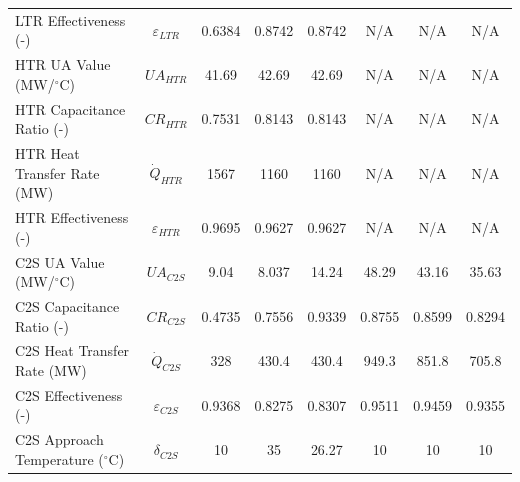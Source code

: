 \begin{specialtable}[H]
{\begin{tabular}{lccccccc}
    LTR Effectiveness (-)	&	$\varepsilon_{LTR}$	&	0.6384	&	0.8742	&	0.8742	&	N/A	&	N/A	&	N/A	\\
    HTR UA Value (MW/$^{\circ}$C)	&	$UA_{HTR}$	&	41.69	&	42.69	&	42.69	&	N/A	&	N/A	&	N/A	\\
    HTR Capacitance Ratio (-)	&	$CR_{HTR}$	&	0.7531	&	0.8143	&	0.8143	&	N/A	&	N/A	&	N/A	\\
    HTR Heat Transfer Rate (MW)	&	$\dot{Q}_{HTR}$	&	1567	&	1160	&	1160	&	N/A	&	N/A	&	N/A	\\
    HTR Effectiveness (-)	&	$\varepsilon_{HTR}$	&	0.9695	&	0.9627	&	0.9627	&	N/A	&	N/A	&	N/A	\\
    C2S UA Value (MW/$^{\circ}$C)	&	$UA_{C2S}$	&	9.04	&	8.037	&	14.24	&	48.29	&	43.16	&	35.63	\\
    C2S Capacitance Ratio (-)	&	$CR_{C2S}$	&	0.4735	&	0.7556	&	0.9339	&	0.8755	&	0.8599	&	0.8294	\\
    C2S Heat Transfer Rate (MW)	&	$\dot{Q}_{C2S}$	&	328	&	430.4	&	430.4	&	949.3	&	851.8	&	705.8	\\
    C2S Effectiveness (-)	&	$\varepsilon_{C2S}$	&	0.9368	&	0.8275	&	0.8307	&	0.9511	&	0.9459	&	0.9355	\\
    C2S Approach Temperature ($^{\circ}$C)	&	$\delta_{C2S}$	&	10	&	35	&	26.27	&	10	&	10	&	10	\\
    \bottomrule
    \end{tabular}
    }
\end{specialtable}
